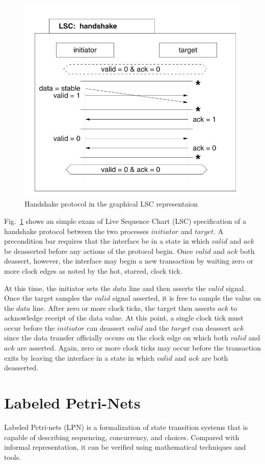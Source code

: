 \documentclass[12pt,frontmatter,copyright,thesis]{usfmanus}
\begin{document}
\begin{figure} [h]
\centerline{
\includegraphics[width=5in]{handshake.png}}
\caption{Handshake protocol in the graphical LSC representaion}
\label{handshake}
\end{figure}
 Fig.~\ref{handshake} shows an simple exam of Live Sequence Chart (LSC) specification of a handshake protocol between
 the two processes $initiator$ and $target$. 
 A precondition bar requires that the interface be in a state in which $valid$ and $ack$ be deasserted 
 before any actions of the protocol begin. 
 Once $valid$ and $ack$ both deassert,
  however, the interface may begin a new transaction by waiting zero or more clock edges as noted by the hot, starred, clock tick.

At this time, the initiator sets the $data$ line and then asserts 
the $valid$ signal. Once the target samples the $valid$ signal asserted, 
it is free to sample the value on the $data$ line. 
After zero or more clock ticks, the target then asserts $ack$ to acknowledge 
receipt of the data value. At this point, a single clock tick must occur before
 the $initiator$ can deassert $valid$ and the $target$ can deassert $ack$ since the 
 data transfer officially occurs on the clock edge on which both $valid$ and $ack$ 
 are asserted. 
 Again, zero or more clock ticks may occur before the transaction
  exits by leaving the interface in a state in which $valid$ and $ack$ are both 
  deasserted. ~\cite{Bunker2005}
  
  
\section{Labeled Petri-Nets}
Labeled Petri-nets (LPN) is a formalization of state transition 
systems that is capable of describing sequencing, concurrency, and choices.  
Compared with informal representation, it can be verified using mathematical techniques
and tools.
 
\end{document}
